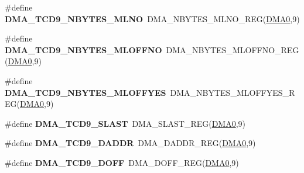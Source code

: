 \begin{DoxyCompactItemize}
\item 
\#define {\bfseries D\+M\+A\+\_\+\+T\+C\+D9\+\_\+\+N\+B\+Y\+T\+E\+S\+\_\+\+M\+L\+NO}~D\+M\+A\+\_\+\+N\+B\+Y\+T\+E\+S\+\_\+\+M\+L\+N\+O\+\_\+\+R\+EG(\hyperlink{group__DMA__Peripheral__Access__Layer_ga4103044f9ca209772f513dc694513ffb}{D\+M\+A0},9)\hypertarget{group__DMA__Register__Accessor__Macros_ga2e2580532266e2bfb8626521ed50bf5d}{}\label{group__DMA__Register__Accessor__Macros_ga2e2580532266e2bfb8626521ed50bf5d}

\item 
\#define {\bfseries D\+M\+A\+\_\+\+T\+C\+D9\+\_\+\+N\+B\+Y\+T\+E\+S\+\_\+\+M\+L\+O\+F\+F\+NO}~D\+M\+A\+\_\+\+N\+B\+Y\+T\+E\+S\+\_\+\+M\+L\+O\+F\+F\+N\+O\+\_\+\+R\+EG(\hyperlink{group__DMA__Peripheral__Access__Layer_ga4103044f9ca209772f513dc694513ffb}{D\+M\+A0},9)\hypertarget{group__DMA__Register__Accessor__Macros_gab692893ea10469e543391d042aad45e1}{}\label{group__DMA__Register__Accessor__Macros_gab692893ea10469e543391d042aad45e1}

\item 
\#define {\bfseries D\+M\+A\+\_\+\+T\+C\+D9\+\_\+\+N\+B\+Y\+T\+E\+S\+\_\+\+M\+L\+O\+F\+F\+Y\+ES}~D\+M\+A\+\_\+\+N\+B\+Y\+T\+E\+S\+\_\+\+M\+L\+O\+F\+F\+Y\+E\+S\+\_\+\+R\+EG(\hyperlink{group__DMA__Peripheral__Access__Layer_ga4103044f9ca209772f513dc694513ffb}{D\+M\+A0},9)\hypertarget{group__DMA__Register__Accessor__Macros_ga1a9eab72523f41a399f2f7201429d28d}{}\label{group__DMA__Register__Accessor__Macros_ga1a9eab72523f41a399f2f7201429d28d}

\item 
\#define {\bfseries D\+M\+A\+\_\+\+T\+C\+D9\+\_\+\+S\+L\+A\+ST}~D\+M\+A\+\_\+\+S\+L\+A\+S\+T\+\_\+\+R\+EG(\hyperlink{group__DMA__Peripheral__Access__Layer_ga4103044f9ca209772f513dc694513ffb}{D\+M\+A0},9)\hypertarget{group__DMA__Register__Accessor__Macros_gabce4d11e5b7029e3466399882977542f}{}\label{group__DMA__Register__Accessor__Macros_gabce4d11e5b7029e3466399882977542f}

\item 
\#define {\bfseries D\+M\+A\+\_\+\+T\+C\+D9\+\_\+\+D\+A\+D\+DR}~D\+M\+A\+\_\+\+D\+A\+D\+D\+R\+\_\+\+R\+EG(\hyperlink{group__DMA__Peripheral__Access__Layer_ga4103044f9ca209772f513dc694513ffb}{D\+M\+A0},9)\hypertarget{group__DMA__Register__Accessor__Macros_ga9acd2cbb405259e09039ecddb5a0b278}{}\label{group__DMA__Register__Accessor__Macros_ga9acd2cbb405259e09039ecddb5a0b278}

\item 
\#define {\bfseries D\+M\+A\+\_\+\+T\+C\+D9\+\_\+\+D\+O\+FF}~D\+M\+A\+\_\+\+D\+O\+F\+F\+\_\+\+R\+EG(\hyperlink{group__DMA__Peripheral__Access__Layer_ga4103044f9ca209772f513dc694513ffb}{D\+M\+A0},9)\hypertarget{group__DMA__Register__Accessor__Macros_ga1a52f2942d7c84c64a15aaa7d8d989ec}{}\label{group__DMA__Register__Accessor__Macros_ga1a52f2942d7c84c64a15aaa7d8d989ec}


\end{DoxyCompactItemize}

